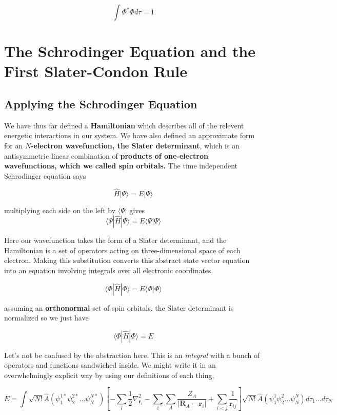 \documentclass[11pt]{article}
\begin{document}
\[ \int \Phi^* \Phi d\tau = 1 \]

\section{The Schrodinger Equation and the First Slater-Condon Rule}

\subsection{Applying the Schrodinger Equation}

We have thus far defined a \textbf{Hamiltonian} which describes all of
the relevent energetic interactions in our system. We have also defined
an approximate form for an \textbf{\(N\)-electron wavefunction, the
Slater determinant}, which is an antisymmetric linear combination of
\textbf{products of one-electron wavefunctions, which we called spin
orbitals.} The time independent Schrodinger equation says

\[ \hat{H} |\Psi \rangle = E |\Psi \rangle \]

multiplying each side on the left by $\langle \Psi|$ gives
\[\langle \Psi |  \hat{H} |\Psi \rangle = E\langle \Psi |\Psi \rangle \]

Here our wavefunction takes the form of a Slater determinant, and the Hamiltonian is a set of operators acting on three-dimensional space
of each electron. Making this substitution converts this abstract state vector equation into an equation involving integrals over all electronic coordinates.

\[\langle \Phi |  \hat{H} |\Phi \rangle = E\langle \Phi |\Phi \rangle \]

assuming an \textbf{orthonormal} set of spin orbitals, the Slater
determinant is normalized so we just have

\[\langle \Phi |  \hat{H} |\Phi \rangle = E \]

Let's not be confused by the abstraction here. This is an
\emph{integral} with a bunch of operators and functions sandwiched
inside. We might write it in an overwhelmingly explicit way by using our
definitions of each thing,

\[E = \int \sqrt{N!} \hat{A} (\psi_1^{1*} \psi_2^{2*} \dots \psi_N^{N*})  \left[ -\sum\limits_{i} \frac{1}{2} \nabla^2_{\boldsymbol{r}_i} - \sum\limits_{i} \sum\limits_{A} \frac{Z_A}{|\boldsymbol{R}_A - \boldsymbol{r}_i|} + \sum\limits_{i < j} \frac{1}{\boldsymbol{r}_{ij}} \right] \sqrt{N!} \hat{A} (\psi_1^{1} \psi_2^{2} \dots \psi_N^{N}) d\tau_1 \dots d\tau_N \]
\end{document}
